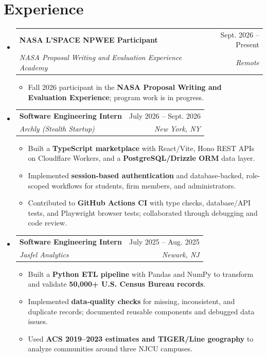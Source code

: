 \documentclass[letterpaper,10pt]{article}
\makeatletter
\newcommand{\resumeItem}[1]{\item\small{#1}}
\newcommand{\resumeSubheading}[4]{
  \vspace{1pt}\item
  \begin{tabular*}{0.97\textwidth}[t]{l@{\extracolsep{\fill}}r}
    \textbf{#1} & #2 \\
    \textit{\small #3} & \textit{\small #4} \\
  \end{tabular*}\vspace{-3pt}
}
\newcommand{\resumeSubHeadingListStart}{\begin{itemize}[leftmargin=0.15in,label={},itemsep=0pt,topsep=0pt]}
\newcommand{\resumeSubHeadingListEnd}{\end{itemize}}
\newcommand{\resumeItemListStart}{\begin{itemize}[leftmargin=0.15in,label=\textbullet,itemsep=-2pt,topsep=0pt]}
\newcommand{\resumeItemListEnd}{\end{itemize}\vspace{0pt}}
\makeatother
\begin{document}
\section{Experience}
\resumeSubHeadingListStart
  \resumeSubheading{NASA L'SPACE NPWEE Participant}{Sept. 2026 -- Present}
    {NASA Proposal Writing and Evaluation Experience Academy}{Remote}
    \resumeItemListStart
      \resumeItem{Fall 2026 participant in the \textbf{NASA Proposal Writing and Evaluation Experience}; program work is in progress.}
    \resumeItemListEnd
  \resumeSubheading{Software Engineering Intern}{July 2026 -- Sept. 2026}
    {Archly (Stealth Startup)}{New York, NY}
    \resumeItemListStart
      \resumeItem{Built a \textbf{TypeScript marketplace} with React/Vite, Hono REST APIs on Cloudflare Workers, and a \textbf{PostgreSQL/Drizzle ORM} data layer.}
      \resumeItem{Implemented \textbf{session-based authentication} and database-backed, role-scoped workflows for students, firm members, and administrators.}
      \resumeItem{Contributed to \textbf{GitHub Actions CI} with type checks, database/API tests, and Playwright browser tests; collaborated through debugging and code review.}
    \resumeItemListEnd
  \resumeSubheading{Software Engineering Intern}{July 2025 -- Aug. 2025}
    {Jasfel Analytics}{Newark, NJ}
    \resumeItemListStart
      \resumeItem{Built a \textbf{Python ETL pipeline} with Pandas and NumPy to transform and validate \textbf{50,000+ U.S. Census Bureau records}.}
      \resumeItem{Implemented \textbf{data-quality checks} for missing, inconsistent, and duplicate records; documented reusable components and debugged data issues.}
      \resumeItem{Used \textbf{ACS 2019--2023 estimates and TIGER/Line geography} to analyze communities around three NJCU campuses.}
    \resumeItemListEnd
\resumeSubHeadingListEnd
\end{document}
